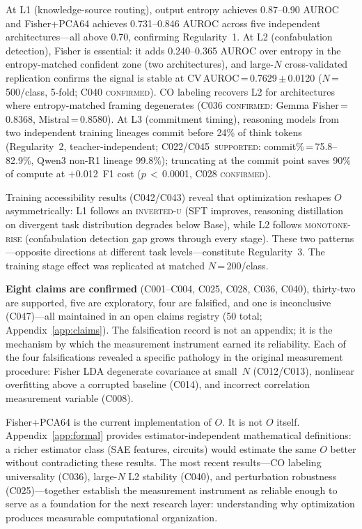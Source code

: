 \documentclass[11pt]{article}
\begin{document}
At L1 (knowledge-source routing), output entropy achieves 0.87--0.90 AUROC and
Fisher+PCA64 achieves 0.731--0.846 AUROC across five independent architectures---all
above 0.70, confirming Regularity~1. At L2 (confabulation detection), Fisher is essential: it
adds 0.240--0.365 AUROC over entropy in the entropy-matched confident zone (two
architectures), and large-$N$ cross-validated replication confirms the signal is stable
at CV\,AUROC\,=\,0.7629\,$\pm$\,0.0120 ($N$\,=\,500/class, 5-fold; C040
\textsc{confirmed}). CO labeling recovers L2 for architectures where entropy-matched
framing degenerates (C036 \textsc{confirmed}: Gemma Fisher\,=\,0.8368,
Mistral\,=\,0.8580). At L3 (commitment timing), reasoning models from two independent
training lineages commit before 24\% of think tokens (Regularity~2, teacher-independent;
C022/C045~\textsc{supported}: commit\%\,=\,75.8--82.9\%, Qwen3 non-R1 lineage 99.8\%); truncating at the commit
point saves 90\% of compute at $+$0.012~F1 cost ($p$\,$<$\,0.0001, C028 \textsc{confirmed}).

Training accessibility results (C042/C043) reveal that optimization reshapes $O$
asymmetrically: L1 follows an \textsc{inverted-u} (SFT improves, reasoning distillation
on divergent task distribution degrades below Base), while L2 follows
\textsc{monotone-rise} (confabulation detection gap grows through every stage). These
two patterns---opposite directions at different task levels---constitute Regularity~3.
The training stage effect was replicated at matched $N$\,=\,200/class.

\textbf{Eight claims are confirmed} (C001--C004, C025, C028, C036, C040), thirty-two are
supported, five are exploratory, four are falsified, and one is inconclusive
(C047)---all maintained in an open claims registry (50 total; Appendix~\ref{app:claims}). The falsification record is not
an appendix; it is the mechanism by which the measurement instrument earned its
reliability. Each of the four falsifications revealed a specific pathology in the
original measurement procedure: Fisher LDA degenerate covariance at small~$N$
(C012/C013), nonlinear overfitting above a corrupted baseline (C014), and incorrect
correlation measurement variable (C008).

Fisher+PCA64 is the current implementation of $O$. It is not $O$ itself. Appendix~\ref{app:formal}
provides estimator-independent mathematical definitions: a richer estimator class
(SAE features, circuits) would estimate the same $O$ better without contradicting
these results. The most recent results---CO labeling universality (C036), large-$N$ L2
stability (C040), and perturbation robustness (C025)---together establish the
measurement instrument as reliable enough to serve as a foundation for the next
research layer: understanding why optimization produces measurable computational
organization.
\end{document}
